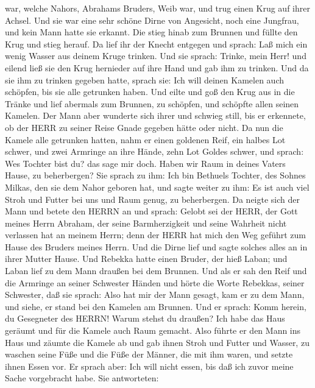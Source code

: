 war, welche Nahors, Abrahams Bruders, Weib war, und trug einen Krug auf
ihrer Achsel.  Und sie war eine sehr schöne Dirne von
Angesicht, noch eine Jungfrau, und kein Mann hatte sie erkannt. Die
stieg hinab zum Brunnen und füllte den Krug und stieg herauf.
 Da lief ihr der Knecht entgegen und sprach: Laß mich ein
wenig Wasser aus deinem Kruge trinken.  Und sie sprach:
Trinke, mein Herr! und eilend ließ sie den Krug hernieder auf ihre Hand
und gab ihm zu trinken.  Und da sie ihm zu trinken gegeben
hatte, sprach sie: Ich will deinen Kamelen auch schöpfen, bis sie alle
getrunken haben.  Und eilte und goß den Krug aus in die
Tränke und lief abermals zum Brunnen, zu schöpfen, und schöpfte allen
seinen Kamelen.  Der Mann aber wunderte sich ihrer und
schwieg still, bis er erkennete, ob der HERR zu seiner Reise Gnade
gegeben hätte oder nicht.  Da nun die Kamele alle getrunken
hatten, nahm er einen goldenen Reif, ein halbes Lot schwer, und zwei
Armringe an ihre Hände, zehn Lot Goldes schwer,  und
sprach: Wes Tochter bist du? das sage mir doch. Haben wir Raum in deines
Vaters Hause, zu beherbergen?  Sie sprach zu ihm: Ich bin
Bethuels Tochter, des Sohnes Milkas, den sie dem Nahor geboren hat,
 und sagte weiter zu ihm: Es ist auch viel Stroh und Futter
bei uns und Raum genug, zu beherbergen.  Da neigte sich der
Mann und betete den HERRN an  und sprach: Gelobt sei der
HERR, der Gott meines Herrn Abraham, der seine Barmherzigkeit und seine
Wahrheit nicht verlassen hat an meinem Herrn; denn der HERR hat mich den
Weg geführt zum Hause des Bruders meines Herrn.  Und die
Dirne lief und sagte solches alles an in ihrer Mutter Hause.
 Und Rebekka hatte einen Bruder, der hieß Laban; und Laban
lief zu dem Mann draußen bei dem Brunnen.  Und als er sah
den Reif und die Armringe an seiner Schwester Händen und hörte die Worte
Rebekkas, seiner Schwester, daß sie sprach: Also hat mir der Mann
gesagt, kam er zu dem Mann, und siehe, er stand bei den Kamelen am
Brunnen.  Und er sprach: Komm herein, du Gesegneter des
HERRN! Warum stehst du draußen? Ich habe das Haus geräumt und für die
Kamele auch Raum gemacht.  Also führte er den Mann ins Haus
und zäumte die Kamele ab und gab ihnen Stroh und Futter und Wasser, zu
waschen seine Füße und die Füße der Männer, die mit ihm waren,
 und setzte ihnen Essen vor. Er sprach aber: Ich will nicht
essen, bis daß ich zuvor meine Sache vorgebracht habe. Sie antworteten:
